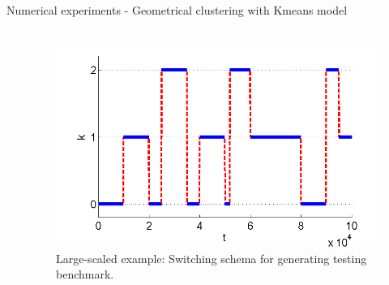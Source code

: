 \documentclass[final,hyperref={pdfpagelabels=false}]{beamer}
\begin{document}
\begin{frame}[t]
\begin{columns}[t]
\begin{column}{.48\textwidth}
\begin{block}{Numerical experiments -  Geometrical clustering with Kmeans model}
\begin{columns}[T]
\begin{column}{0.02\linewidth}\end{column}
\begin{column}{0.46\linewidth}
	\begin{figure}[H]
		\begin{center}
			\includegraphics[width=1.0\linewidth, angle=0, clip = true]{figures/generator.png}
			\caption{Large-scaled example: Switching schema for generating testing benchmark.
					 }
			\label{fig:kmeans_pizdaint1}	
		\end{center}
	\end{figure}


\end{column}
\end{columns}
\end{block}
\end{column}
\end{columns}
\end{frame}
\end{document}
